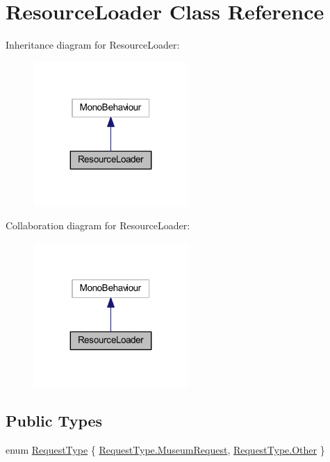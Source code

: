 \hypertarget{class_resource_loader}{}\section{Resource\+Loader Class Reference}
\label{class_resource_loader}


Inheritance diagram for Resource\+Loader\+:
\nopagebreak
\begin{figure}[H]
\begin{center}
\leavevmode
\includegraphics[width=167pt]{class_resource_loader__inherit__graph}
\end{center}
\end{figure}


Collaboration diagram for Resource\+Loader\+:
\nopagebreak
\begin{figure}[H]
\begin{center}
\leavevmode
\includegraphics[width=167pt]{class_resource_loader__coll__graph}
\end{center}
\end{figure}
\subsection*{Public Types}
\begin{DoxyCompactItemize}
\item 
enum \mbox{\hyperlink{class_resource_loader_a55469e5c9294ec83732bfa4e2c3135ab}{Request\+Type}} \{ \mbox{\hyperlink{class_resource_loader_a55469e5c9294ec83732bfa4e2c3135abae9bfe9055aff7833d2f507392005faef}{Request\+Type.\+Museum\+Request}}, 
\mbox{\hyperlink{class_resource_loader_a55469e5c9294ec83732bfa4e2c3135aba6311ae17c1ee52b36e68aaf4ad066387}{Request\+Type.\+Other}}
 \}
\end{DoxyCompactItemize}
